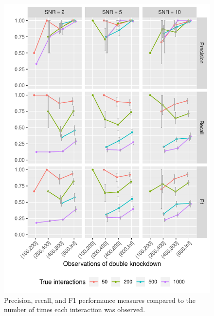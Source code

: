 \begin{figure}
\begin{minipage}{\linewidth}
	\includegraphics[width=0.5\linewidth]{"output/NumObservations_n10000_tyes"}
\end{minipage}
\caption{Precision, recall, and F1 performance measures compared to the number of times each interaction was observed.}
\end{figure}





